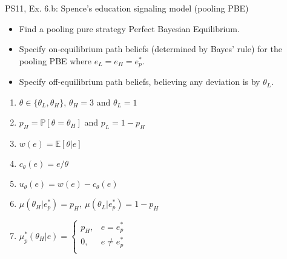 \begin{frame}{PS11, Ex. 6.b: Spence’s education signaling model (pooling PBE)}
    \begin{itemize}
      \item[(b)] Find a pooling pure strategy Perfect Bayesian Equilibrium.
    \end{itemize}\vspace{-8pt}
    \begin{multicols}{2}
      \begin{itemize}
        \item[Step 1:] Specify on-equilibrium path beliefs (determined by Bayes' rule) for the pooling PBE where $e_L=e_H=e_p^*$.
        \item[Step 2:] Specify off-equilibrium path beliefs, believing any deviation is by $\theta_L$.
      \end{itemize}
      \vfill\null\columnbreak
      \begin{enumerate}
        \item[Types:] $\theta\in\{\theta_L,\theta_H\}$, $\theta_H=3$ and $\theta_L=1$
        \item[Prob.:] $p_H=\mathbb{P}[\theta=\theta_H]$ and $p_L=1-p_H$
        \item[Wage:] $w(e)=\mathbb{E}[\theta|e]$
        \item[Cost:] $c_\theta(e)=e/\theta$
        \item[Utility:] $u_\theta(e)=w(e)-c_\theta(e)$
        \item $\mu\left(\theta_H|e_p^*\right)=p_H,\
               \mu\left(\theta_L|e_p^*\right)=1-p_H$
        \item $\mu_p^*(\theta_H|e)=\left\{\begin{array}{rl}
                  p_H, & e = e_p^* \\
                  0, & e \neq e_p^* \\
               \end{array}\right.$
      \end{enumerate}
      \vfill\null
    \end{multicols}
\end{frame}
